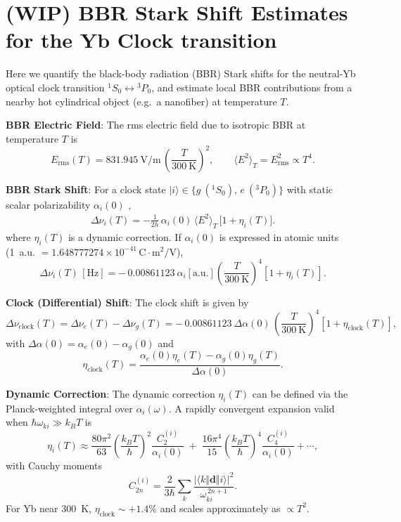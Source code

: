 \documentclass[aps,pra, onecolumn,superscriptaddress,nopacs,floatfix, showkeys, notitlepage]{revtex4-1}
\begin{document}
\iffalse

\section{(WIP) BBR Stark Shift Estimates for the Yb Clock transition}
Here we quantify the black-body radiation (BBR) Stark shifts for the neutral-Yb optical clock transition
\({}^{1}S_{0}\leftrightarrow {}^{3}P_{0}\), and estimate local BBR contributions from a nearby hot cylindrical object (e.g.\ a nanofiber) at temperature $T$.

{\bf BBR Electric Field}: The rms electric field due to isotropic BBR at temperature $T$ is
\begin{equation}
E_\mathrm{rms}(T) = 831.945~\mathrm{V/m}\,\left(\frac{T}{300~\mathrm{K}}\right)^{2}, \qquad
\langle E^{2}\rangle_{T} = E_\mathrm{rms}^{2} \propto T^{4}.
\end{equation}

{\bf BBR Stark Shift}: For a clock state $\lvert i\rangle\in\{g~(^{1}S_{0}),\,e~(^{3}P_{0})\}$ with static scalar polarizability $\alpha_i(0)$ \cite{Porsev2006},
\begin{eqnarray}
    \Delta\nu_i(T) = -\frac{1}{2h}\,\alpha_i(0)\,\langle E^{2}\rangle_{T}\,\bigl[1+\eta_i(T)\bigr].
\end{eqnarray}
where $\eta_i(T)$ is a dynamic correction. 
If $\alpha_i(0)$ is expressed in atomic units (1~a.u. $=1.648777274\times10^{-41}\,\mathrm{C\cdot m^{2}/V}$),
\begin{equation}
\Delta\nu_i(T)\,[\mathrm{Hz}] = -\,0.00861123\ \alpha_i[\mathrm{a.u.}] \left(\frac{T}{300~\mathrm{K}}\right)^{4} \left[1+\eta_i(T)\right].
\end{equation}

{\bf Clock (Differential) Shift}:
The clock shift is given by
\begin{equation}
\Delta\nu_\text{clock}(T) = \Delta\nu_{e}(T)-\Delta\nu_{g}(T)
= -\,0.00861123\ \Delta\alpha(0)\,
\left(\frac{T}{300~\mathrm{K}}\right)^{4} \left[1+\eta_\text{clock}(T)\right],
\end{equation}
with $\Delta\alpha(0)=\alpha_{e}(0)-\alpha_{g}(0)$ and
\begin{equation}
\eta_\text{clock}(T) = \frac{\alpha_{e}(0)\eta_{e}(T)-\alpha_{g}(0)\eta_{g}(T)}{\Delta\alpha(0)}.
\end{equation}

{\bf Dynamic Correction}:
The dynamic correction $\eta_i(T)$ can be defined via the Planck-weighted integral over $\alpha_i(\omega)$.  
A rapidly convergent expansion valid when $\hbar\omega_{ki}\gg k_BT$ is
\begin{equation}
\eta_i(T) \approx \frac{80\pi^{2}}{63}\left(\frac{k_BT}{\hbar}\right)^{2}\frac{C_{2}^{(i)}}{\alpha_i(0)} \;+\;
\frac{16\pi^{4}}{15}\left(\frac{k_BT}{\hbar}\right)^{4}\frac{C_{4}^{(i)}}{\alpha_i(0)}+\cdots,
\end{equation}
with Cauchy moments
\begin{equation}
C^{(i)}_{2n} = \frac{2}{3\hbar}\sum_k \frac{|\langle k\Vert\mathbf d\Vert i\rangle|^{2}}{\omega_{ki}^{\,2n+1}}.
\end{equation}
For Yb near 300~K, $\eta_\text{clock}\sim +1.4\%$ and scales approximately as $\propto T^{2}$.
\end{document}
